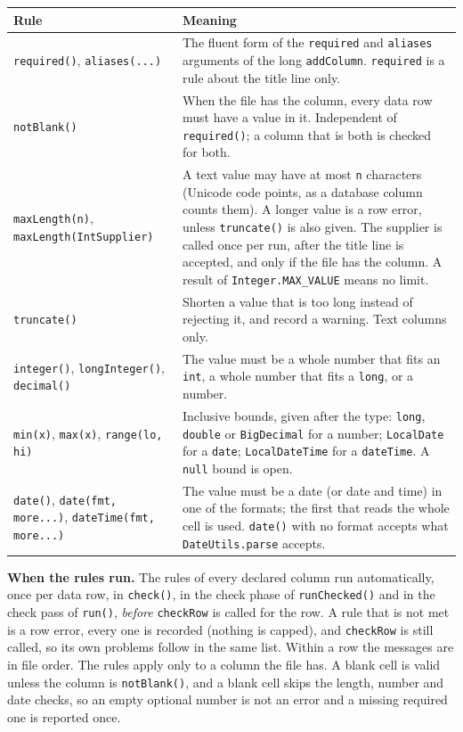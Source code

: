 \begin{longtable}{P{4.6cm}P{6.0cm}}
\toprule
\textbf{Rule} & \textbf{Meaning} \\
\midrule
\endhead
\texttt{required()}, \texttt{aliases(...)} & The fluent form of the \texttt{required} and \texttt{aliases} arguments of the long \texttt{addColumn}.  \texttt{required} is a rule about the title line only. \\
\texttt{notBlank()} & When the file has the column, every data row must have a value in it.  Independent of \texttt{required()}; a column that is both is checked for both. \\
\texttt{maxLength(n)}, \texttt{maxLength(IntSupplier)} & A text value may have at most \texttt{n} characters (Unicode code points, as a database column counts them).  A longer value is a row error, unless \texttt{truncate()} is also given.  The supplier is called once per run, after the title line is accepted, and only if the file has the column.  A result of \texttt{Integer.MAX\_VALUE} means no limit. \\
\texttt{truncate()} & Shorten a value that is too long instead of rejecting it, and record a warning.  Text columns only. \\
\texttt{integer()}, \texttt{longInteger()}, \texttt{decimal()} & The value must be a whole number that fits an \texttt{int}, a whole number that fits a \texttt{long}, or a number. \\
\texttt{min(x)}, \texttt{max(x)}, \texttt{range(lo, hi)} & Inclusive bounds, given after the type: \texttt{long}, \texttt{double} or \texttt{BigDecimal} for a number; \texttt{LocalDate} for a \texttt{date}; \texttt{LocalDateTime} for a \texttt{dateTime}.  A \texttt{null} bound is open. \\
\texttt{date()}, \texttt{date(fmt, more...)}, \texttt{dateTime(fmt, more...)} & The value must be a date (or date and time) in one of the formats; the first that reads the whole cell is used.  \texttt{date()} with no format accepts what \texttt{DateUtils.parse} accepts. \\
\bottomrule
\end{longtable}

\textbf{When the rules run.}  The rules of every declared column run automatically, once per data row, in \texttt{check()}, in the check phase of \texttt{runChecked()} and in the check pass of \texttt{run()}, \emph{before} \texttt{checkRow} is called for the row.  A rule that is not met is a row error, every one is recorded (nothing is capped), and \texttt{checkRow} is still called, so its own problems follow in the same list.  Within a row the messages are in file order.  The rules apply only to a column the file has.  A blank cell is valid unless the column is \texttt{notBlank()}, and a blank cell skips the length, number and date checks, so an empty optional number is not an error and a missing required one is reported once.

